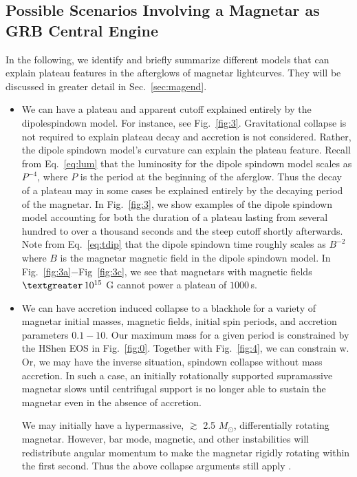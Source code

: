 \documentclass{article}
\begin{document}
\subsection{Possible Scenarios Involving a Magnetar as GRB Central Engine} \label{sec:42}

In the following, we identify and briefly summarize different models that can explain plateau features in the afterglows of magnetar lightcurves. They will be discussed in greater detail in Sec.~\ref{sec:magend}.

\begin{itemize}
\item We can have a plateau and apparent cutoff explained entirely by the dipolespindown model. For instance, see Fig.~\ref{fig:3}. Gravitational collapse is not required to explain plateau decay and accretion is not considered. Rather, the dipole spindown model's curvature can explain the plateau feature. Recall from Eq.~\ref{eq:lum} that the luminosity for the dipole spindown model scales as $P^{-4}$, where $P$ is the period at the beginning of the aferglow. Thus the decay of a plateau may in some cases be explained entirely by the decaying period of the magnetar. In Fig.~\ref{fig:3}, we show examples of the dipole spindown model accounting for both the duration of a plateau lasting from several hundred to over a thousand seconds and the steep cutoff shortly afterwards. Note from Eq.~\ref{eq:tdip} that the dipole spindown time roughly scales as $B^{-2}$ where $B$ is the magnetar magnetic field in the dipole spindown model. In Fig.~\ref{fig:3a}$-$Fig~\ref{fig:3c}, we see that magnetars with magnetic fields $\textgreater\,10^{15}$ G cannot power a plateau of $1000$\,s. \newline

\item We can have accretion induced collapse to a blackhole for a variety of magnetar initial masses, magnetic fields, initial spin periods, and accretion parameters $0.1-10$. Our maximum mass for a given period is constrained by the HShen EOS in Fig.~\ref{fig:0}. Together with Fig.~\ref{fig:4}, we can constrain w. Or, we may have the inverse situation, spindown collapse without mass accretion. In such a case, an initially rotationally supported supramassive magnetar slows until centrifugal support is no longer able to sustain the magnetar even in the absence of accretion.  \newline

We may initially have a hypermassive, $\gtrsim$ 2.5 $M_{\odot}$,  differentially rotating magnetar. However, bar mode, magnetic, and other instabilities will redistribute angular momentum to make the magnetar rigidly rotating within the first second. Thus the above collapse arguments still apply \cite{Baumgarte:1999cq}. \newline


\end{itemize}
\end{document}
